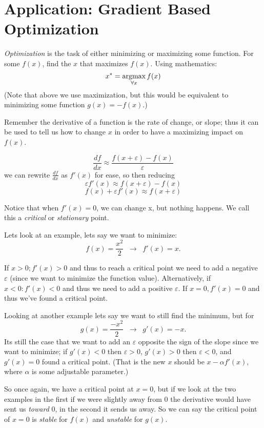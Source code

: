 
\section{Application: Gradient Based Optimization}
\emph{Optimization} is the task of either minimizing or maximizing some function. 
For some $f(x)$, find the $x$ that maximizes $f(x)$. 
Using mathematics: 
\[ x^* = \operatorname*{argmax}_{\forall x} f(x) \]
(Note that above we use maximization, but this would be equivalent to minimizing some function $g(x)=-f(x)$.)

Remember the derivative of a function is the rate of change, or slope; 
thus it can be used to tell us how to change $x$ in order to have a maximizing impact on $f(x)$. 

\[\frac{df}{dx} \approx \frac{f(x+\varepsilon)-f(x)}{\varepsilon}\]
we can rewrite $\frac{df}{dx}$ as $f'(x)$ for ease, so then reducing
\[\varepsilon f'(x) \approx f(x+\varepsilon)-f(x)\]
\[f(x) + \varepsilon f'(x) \approx f(x+\varepsilon)\]

Notice that when $f'(x)=0$, we can change x, but nothing happens. 
We call this a \emph{critical} or \emph{stationary} point. 

Lets look at an example, lets say we want to minimize: 
\[f(x) = \frac{x^2}{2}  \;\;\rightarrow\;\; f'(x) = x.\]

If $x>0; f'(x)>0$ and thus to reach a critical point we need to add a negative $\varepsilon$ 
(since we want to minimize the function value). 
Alternatively, if $x<0: f'(x)<0$ and thus we need to add a positive $\varepsilon$. 
If $x=0, f'(x)=0$ and thus we've found a critical point. 

Looking at another example lets say we want to still find the minimum, but for 
\[g(x) = \frac{-x^2}{2}  \;\;\rightarrow\;\; g'(x) = -x.\]
Its still the case that we want to add an $\varepsilon$ opposite the sign of the slope since we want to minimize; 
if $g'(x)<0$ then $\varepsilon>0$, $g'(x)>0$ then $\varepsilon<0$, and $g'(x)=0$ found a critical point. 
(That is the new $x$ should be {\color{red}$x-\alpha f'(x)$}, where $\alpha$ is some adjustable parameter.)

So once again, we have a critical point at $x=0$, 
but if we look at the two examples in the first if we were slightly away from 0 the derivative would have sent us \textit{toward} 0, in the second it sends us away. 
So we can say the critical point of $x=0$ is \emph{stable} for $f(x)$ and \emph{unstable} for $g(x)$. 

